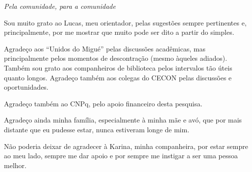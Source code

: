 \documentclass[
12pt,				%
openright,			%
oneside,			%
a4paper,		%
english,			%
brazil,				%
sumario=tradicional,
]{abntex2}
\begin{document}
\begin{dedicatoria}
	\vspace*{\fill}
	\centering
	\noindent
	\textit{Pela comunidade, para a comunidade}
	\vspace*{\fill}
\end{dedicatoria}
%
\begin{agradecimentos}
Sou muito grato ao Lucas, meu orientador, pelas sugestões sempre pertinentes e, principalmente, por me mostrar que muito pode ser dito a partir do simples.

Agradeço aos ``Unidos do Migué'' pelas discussões acadêmicas, mas principalmente pelos momentos de descontração (mesmo àqueles adiados). Também sou grato aos companheiros de biblioteca pelos intervalos tão úteis quanto longos. Agradeço também aos colegas do CECON pelas discussões e oportunidades.

Agradeço também ao CNPq, pelo apoio financeiro desta pesquisa.

Agradeço ainda minha família, especialmente à minha mãe e avó, que por mais distante que eu pudesse estar, nunca estiveram longe de mim.

Não poderia deixar de agradecer à Karina, minha companheira, por estar sempre ao meu lado, sempre me dar apoio e por sempre me instigar a ser uma pessoa melhor. 
\end{agradecimentos}

%
\end{document}
